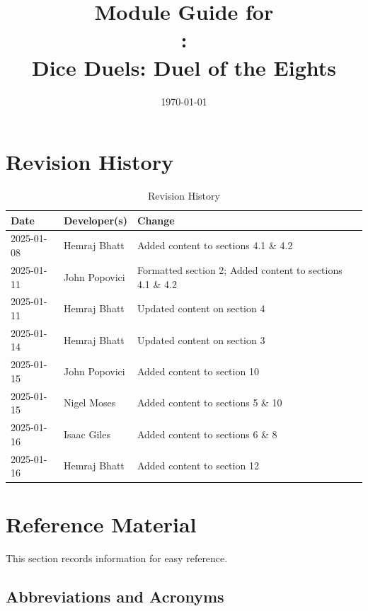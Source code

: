 \documentclass[12pt, titlepage]{article}
\begin{document}
\title{Module Guide for \\\progname: \\Dice Duels: Duel of the Eights} 
\author{\authname}
\date{\today}

\maketitle


\section{Revision History}

\begin{table}[hp]
\caption{Revision History} \label{TblRevisionHistory}
\begin{tabularx}{\textwidth}{llX}
\toprule
\textbf{Date} & \textbf{Developer(s)} & \textbf{Change}\\
\midrule
2025-01-08 & Hemraj Bhatt & Added content to sections 4.1 \& 4.2\\
2025-01-11 & John Popovici & Formatted section 2; Added content to sections 4.1 \& 4.2\\
2025-01-11 & Hemraj Bhatt & Updated content on section 4\\
2025-01-14 & Hemraj Bhatt & Updated content on section 3\\
2025-01-15 & John Popovici & Added content to section 10\\
2025-01-15 & Nigel Moses & Added content to sections 5 \& 10\\
2025-01-16 & Isaac Giles & Added content to sections 6 \& 8\\
2025-01-16 & Hemraj Bhatt & Added content to section 12\\
\bottomrule
\end{tabularx}
\end{table}

\newpage

\section{Reference Material}

This section records information for easy reference.

\subsection{Abbreviations and Acronyms}
\end{document}
